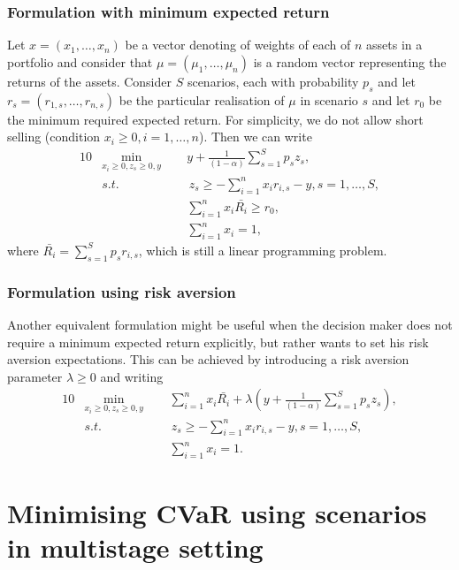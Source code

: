 \subsubsection*{Formulation with minimum expected return}
Let $x=(x_1,\dots,x_n)$ be a vector denoting of weights of each of $n$ assets in a portfolio and consider that $\mu=(\mu_1,\dots,\mu_n)$ is a random vector representing the returns of the assets. Consider $S$ scenarios, each with probability $p_s$ and let $r_s = (r_{1,s},\dots,r_{n,s})$ be the particular realisation of $\mu$ in scenario $s$ and let $r_0$ be the minimum required expected return. For simplicity, we do not allow short selling (condition $x_i \geq 0, i=1,\dots,n$). Then we can write
\begin{alignat}{10}
\label{eq:cvar_minimum_expected_return}
& \underset{x_i \geq 0 , z_s \geq 0, y}{\min}  \, \, \, && y + \frac{1}{(1-\alpha)} \sum_{s=1}^S p_s z_s, \nonumber \\
&s.t. && \, z_s \geq  -\sum_{i=1}^{n} x_i r_{i,s} -y, s=1,\dots,S, \nonumber \\
&  && \sum_{i=1}^{n} x_i \bar{R_i} \geq r_0, \nonumber \\
&  && \sum_{i=1}^{n} x_i = 1, \nonumber
\end{alignat}
where $\bar{R_i}=\sum_{s=1}^{S}p_s r_{i,s}$, which is still a linear programming problem.
\subsubsection*{Formulation using risk aversion}
Another equivalent formulation might be useful when the decision maker does not require a minimum expected return explicitly, but rather wants to set his risk aversion expectations. This can be achieved by introducing a risk aversion parameter $\lambda \geq 0$ and writing
\begin{alignat}{10}
\label{eq:cvar_risk_aversion}
& \underset{x_i \geq 0 , z_s \geq 0, y}{\min}  \, \, \, && \sum_{i=1}^{n} x_i \bar{R_i} + \lambda \left( y + \frac{1}{(1-\alpha)} \sum_{s=1}^S p_s z_s \right), \nonumber \\
&s.t. && \, z_s \geq  -\sum_{i=1}^{n} x_i r_{i,s} -y, s=1,\dots,S, \nonumber \\
&  && \sum_{i=1}^{n} x_i = 1. \nonumber
\end{alignat}
\section{Minimising CVaR using scenarios in multistage setting}
